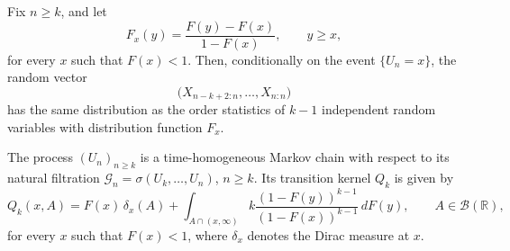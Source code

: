 \documentclass[10pt,a4paper]{amsart}
\begin{document}
\begin{lemma}
\label{lem:conditional-upper-order-stats}
Fix $n\ge k$, and let
\[
F_x(y)=\frac{F(y)-F(x)}{1-F(x)}, \qquad y\ge x,
\]
for every $x$ such that $F(x)<1$. Then, conditionally on the event $\{U_n=x\}$, the random vector
\[
\bigl(X_{n-k+2:n},\dots,X_{n:n}\bigr)
\]
has the same distribution as the order statistics of $k-1$ independent random variables with distribution function $F_x$.
\end{lemma}

\begin{theorem}
\label{thm:transition-kernel-Un}
The process $(U_n)_{n\ge k}$ is a time-homogeneous Markov chain 
with respect to its natural filtration
$\mathcal{G}_n=\sigma(U_k,\dots,U_n)$, $n\ge k$.
Its transition kernel $Q_k$ is given by
\begin{equation}
\label{eq:transition-kernel-Un}
Q_k(x,A)
=
F(x)\,\delta_x(A)
+
\int_{A\cap(x,\infty)}
k\frac{(1-F(y))^{k-1}}{(1-F(x))^{k-1}}\,dF(y),
\qquad A\in\mathcal{B}(\mathbb{R}),
\end{equation}
for every $x$ such that $F(x)<1$, where $\delta_x$ denotes the Dirac measure at $x$.
\end{theorem}
\end{document}
